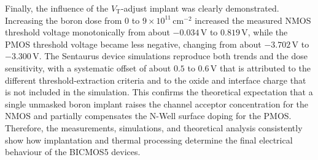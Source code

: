 Finally, the influence of the $V_\mathrm{T}$-adjust implant was clearly demonstrated. Increasing the boron dose from $0$ to $9\times10^{11}\,\text{cm}^{-2}$ increased the measured NMOS threshold voltage monotonically from about $-0.034\,\text{V}$ to $0.819\,\text{V}$, while the PMOS threshold voltage became less negative, changing from about $-3.702\,\text{V}$ to $-3.300\,\text{V}$. The Sentaurus device simulations reproduce both trends and the dose sensitivity, with a systematic offset of about $0.5$ to $0.6\,\text{V}$ that is attributed to the different threshold-extraction criteria and to the oxide and interface charge that is not included in the simulation. This confirms the theoretical expectation that a single unmasked boron implant raises the channel acceptor concentration for the NMOS and partially compensates the N-Well surface doping for the PMOS. Therefore, the measurements, simulations, and theoretical analysis consistently show how implantation and thermal processing determine the final electrical behaviour of the BICMOS5 devices.
